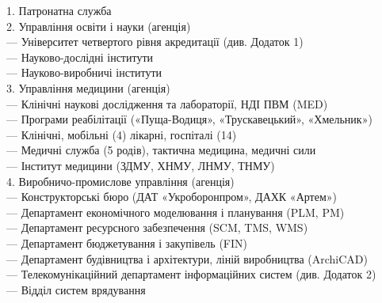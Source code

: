 1. Патронатна служба \\
2. Управління освіти і науки (агенція) \\
\hspace{2cm}     — Університет четвертого рівня акредитації (див. Додаток 1) \\
\hspace{2cm}     — Науково-дослідні інститути \\
\hspace{2cm}     — Науково-виробничі інститути \\
3. Управління медицини (агенція) \\
\hspace{2cm}     — Клінічні наукові дослідження та лабораторії, НДІ ПВМ (MED) \\
\hspace{2cm}     — Програми реабілітації («Пуща-Водиця», «Трускавецький», «Хмельник») \\
\hspace{2cm}     — Клінічні, мобільні (4) лікарні, госпіталі (14) \\
\hspace{2cm}     — Медичні служба (5 родів), тактична медицина, медичні сили \\
\hspace{2cm}     — Інститут медицини (ЗДМУ, ХНМУ, ЛНМУ, ТНМУ) \\
4. Виробничо-промислове управління (агенція) \\
\hspace{2cm}     — Конструкторські бюро (ДАТ «Укроборонпром», ДАХК «Артем») \\
\hspace{2cm}     — Департамент економічного моделювання і планування (PLM, PM) \\
\hspace{2cm}     — Департамент ресурсного забезпечення (SCM, TMS, WMS) \\
\hspace{2cm}     — Департамент бюджетування і закупівель (FIN) \\
\hspace{2cm}     — Департамент будівництва і архітектури, ліній виробництва (ArchiCAD) \\
\hspace{2cm}     — Телекомунікаційний департамент інформаційних систем (див. Додаток 2) \\
\hspace{4cm}         — Відділ систем врядування \\
